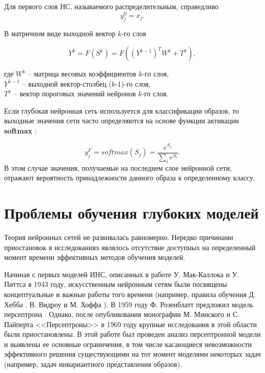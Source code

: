 Для первого слоя НС, называемого распределительным, справедливо		
\begin{equation}
y_j^0=x_j.
\end{equation}

В матричном виде выходной вектор $k$-го слоя 

\begin{equation}
Y^k=F(S^k)=F((Y^{k-1})^TW^k+T^k),
\end{equation}
\begin{tabbing}	
где \=$W^k$ -- матрица весовых коэффициентов $k$-го слоя,\\
\>$Y^{k-1}$ -- выходной вектор-столбец ($k$-1)-го слоя,\\
\>$T^k$ -- вектор пороговых значений нейронов $k$-го слоя.
\end{tabbing}

Если глубокая нейронная сеть используется для классификации образов, то выходные значения сети часто определяются на основе функции активации \textbf{softmax} \cite[c.~34]{golovko2017}: 		

\begin{equation}
y_j^F=softmax(S_j)=\frac{e^{S_j}}{\sum_i e^{S_i}}.
\end{equation}
В этом случае значения, получаемые на последнем слое нейронной сети, отражают вероятность принадлежности данного образа к определенному классу.

\section{Проблемы обучения глубоких моделей}

Теория нейронных сетей не развивалась равномерно. Нередко причинами приостановок в исследованиях являлось отсутствие доступных на определенный момент времени эффективных методов обучения моделей. 

Начиная с первых моделей ИНС, описанных в работе У. Мак-Каллока и У. Питтса \cite[c.~105]{mcculloch43a} в 1943 году, искусственным нейронным сетям были посвящены концептуальные и важные работы того времени (например, правила обучения Д. Хебба \cite[c.~62]{hebb1949}, В. Видроу и М. Хоффа \cite[c.~99]{widrow1960}). В 1959 году Ф. Розенблатт предложил модель персептрона \cite[c.~99]{Rosenblatt1962}. Однако, после опубликования монографии М. Минского и С. Пайперта <<Персептроны>> в 1969 году \cite[c.~249]{minsky69perceptrons} крупные исследования в этой области были приостановлены. В этой работе был проведен анализ персептронной модели и выявлены ее основные ограничения, в том числе касающиеся невозможности эффективного решения существующими на тот момент моделями некоторых задач (например, задач инвариантного представления образов). %

